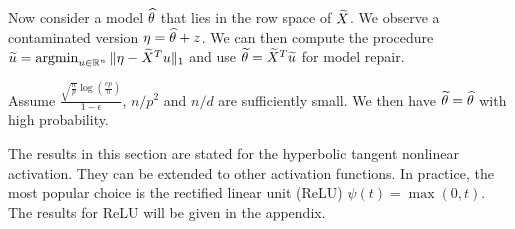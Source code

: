 Now consider a model $\widehat{\theta}$ that lies in the row space of $\widetilde{X}$. We observe a contaminated version $\eta=\widehat{\theta}+z$.
We can then compute the procedure $\widetilde{u}=\mathop{\rm argmin}_{u\in\mathbb{R}^n}\|\eta-\widetilde{X}^Tu\|_1$ and use $\widetilde{\theta}=\widetilde{X}^T\widetilde{u}$ for model repair.

\begin{corollary}\label{cor:repair-rf}
Assume $\frac{\sqrt{\frac{n}{p}}\log\left(\frac{ep}{n}\right)}{1-\epsilon}$, $n/p^2$ and $n/d$ are sufficiently small. We then have $\widetilde{\theta}=\widehat{\theta}$ with high probability.
\end{corollary}

The results in this section are stated for the hyperbolic tangent nonlinear activation. They can be extended to other activation functions. In practice, the most popular choice is the rectified linear unit (ReLU) $\psi(t)=\max(0,t)$. The results for ReLU will be given in the appendix.